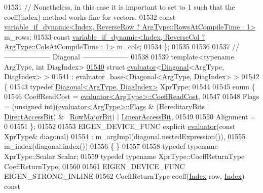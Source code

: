 \begin{DoxyCode}
01531   \textcolor{comment}{// Nonetheless, in this case it is important to set to 1 such that the coeff(index) method works fine for
       vectors.}
01532   \textcolor{keyword}{const} \hyperlink{class_eigen_1_1internal_1_1variable__if__dynamic}{variable\_if\_dynamic<Index, ReverseRow ? ArgType::RowsAtCompileTime : 1>}
       m\_rows;
01533   \textcolor{keyword}{const} \hyperlink{class_eigen_1_1internal_1_1variable__if__dynamic}{variable\_if\_dynamic<Index, ReverseCol ? ArgType::ColsAtCompileTime : 1>}
       m\_cols;
01534 \};
01535 
01536 
01537 \textcolor{comment}{// -------------------- Diagonal --------------------}
01538 
01539 \textcolor{keyword}{template}<\textcolor{keyword}{typename} ArgType, \textcolor{keywordtype}{int} DiagIndex>
\hyperlink{struct_eigen_1_1internal_1_1evaluator_3_01_diagonal_3_01_arg_type_00_01_diag_index_01_4_01_4}{01540} \textcolor{keyword}{struct }\hyperlink{struct_eigen_1_1internal_1_1evaluator}{evaluator}<\hyperlink{group___core___module_class_eigen_1_1_diagonal}{Diagonal}<ArgType, DiagIndex> >
01541   : \hyperlink{struct_eigen_1_1internal_1_1evaluator__base}{evaluator\_base}<Diagonal<ArgType, DiagIndex> >
01542 \{
01543   \textcolor{keyword}{typedef} \hyperlink{group___core___module_class_eigen_1_1_diagonal}{Diagonal<ArgType, DiagIndex>} XprType;
01544   
01545   \textcolor{keyword}{enum} \{
01546     CoeffReadCost = \hyperlink{struct_eigen_1_1internal_1_1evaluator}{evaluator<ArgType>::CoeffReadCost},
01547     
01548     Flags = (\textcolor{keywordtype}{unsigned} int)(\hyperlink{struct_eigen_1_1internal_1_1evaluator}{evaluator<ArgType>::Flags} & (HereditaryBits | 
      \hyperlink{group__flags_gabf1e9d0516a933445a4c307ad8f14915}{DirectAccessBit}) & ~\hyperlink{group__flags_gae4f56c2a60bbe4bd2e44c5b19cbe8762}{RowMajorBit}) | \hyperlink{group__flags_ga4b983a15d57cd55806df618ac544d09e}{LinearAccessBit},
01549     
01550     Alignment = 0
01551   \};
01552 
01553   EIGEN\_DEVICE\_FUNC \textcolor{keyword}{explicit} \hyperlink{struct_eigen_1_1internal_1_1evaluator}{evaluator}(\textcolor{keyword}{const} XprType& diagonal)
01554     : m\_argImpl(diagonal.nestedExpression()),
01555       m\_index(diagonal.index())
01556   \{ \}
01557  
01558   \textcolor{keyword}{typedef} \textcolor{keyword}{typename} XprType::Scalar Scalar;
01559   \textcolor{keyword}{typedef} \textcolor{keyword}{typename} XprType::CoeffReturnType CoeffReturnType;
01560 
01561   EIGEN\_DEVICE\_FUNC EIGEN\_STRONG\_INLINE
01562   CoeffReturnType coeff(\hyperlink{namespace_eigen_a62e77e0933482dafde8fe197d9a2cfde}{Index} row, \hyperlink{namespace_eigen_a62e77e0933482dafde8fe197d9a2cfde}{Index})\textcolor{keyword}{ const}

\end{DoxyCode}
